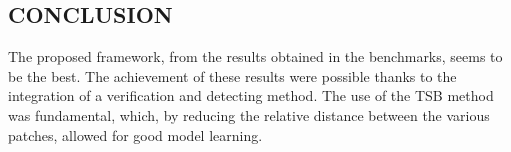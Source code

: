 \subsection{CONCLUSION}
The proposed framework, from the results obtained in the benchmarks, seems 
to be the best. The achievement of these results were possible thanks to the 
integration of a verification and detecting method. The use of the TSB 
method was fundamental, which, by reducing the relative distance between 
the various patches, allowed for good model learning.